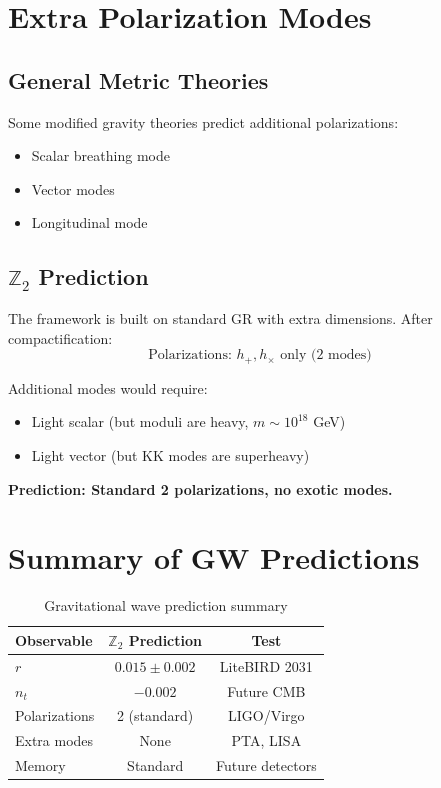 \documentclass[12pt,a4paper]{article}
\begin{document}
\section{Extra Polarization Modes}

\subsection{General Metric Theories}

Some modified gravity theories predict additional polarizations:
\begin{itemize}
    \item Scalar breathing mode
    \item Vector modes
    \item Longitudinal mode
\end{itemize}

\subsection{$\mathbb{Z}_2$ Prediction}

The framework is built on standard GR with extra dimensions. After compactification:
\begin{equation}
\text{Polarizations: } h_+, h_\times \text{ only (2 modes)}
\end{equation}

Additional modes would require:
\begin{itemize}
    \item Light scalar (but moduli are heavy, $m \sim 10^{18}$ GeV)
    \item Light vector (but KK modes are superheavy)
\end{itemize}

\textbf{Prediction: Standard 2 polarizations, no exotic modes.}

\section{Summary of GW Predictions}

\begin{table}[h]
\centering
\begin{tabular}{lcc}
\toprule
Observable & $\mathbb{Z}_2$ Prediction & Test \\
\midrule
$r$ & $0.015 \pm 0.002$ & LiteBIRD 2031 \\
$n_t$ & $-0.002$ & Future CMB \\
Polarizations & 2 (standard) & LIGO/Virgo \\
Extra modes & None & PTA, LISA \\
Memory & Standard & Future detectors \\
\bottomrule
\end{tabular}
\caption{Gravitational wave prediction summary}
\end{table}
\end{document}
